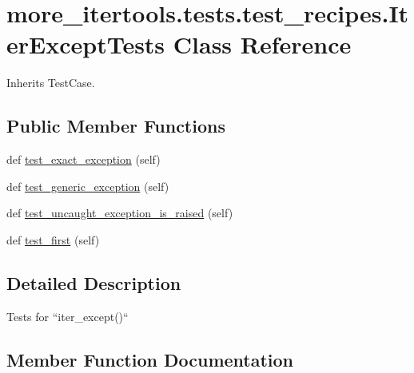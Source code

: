 \hypertarget{classmore__itertools_1_1tests_1_1test__recipes_1_1_iter_except_tests}{}\section{more\+\_\+itertools.\+tests.\+test\+\_\+recipes.\+Iter\+Except\+Tests Class Reference}
\label{classmore__itertools_1_1tests_1_1test__recipes_1_1_iter_except_tests}


Inherits Test\+Case.

\subsection*{Public Member Functions}
\begin{DoxyCompactItemize}
\item 
def \hyperlink{classmore__itertools_1_1tests_1_1test__recipes_1_1_iter_except_tests_a9fdd0549d842e44fb27e8eb0ee215c4c}{test\+\_\+exact\+\_\+exception} (self)
\item 
def \hyperlink{classmore__itertools_1_1tests_1_1test__recipes_1_1_iter_except_tests_a9814b5dc3823464c6ad5ba00b3cfc005}{test\+\_\+generic\+\_\+exception} (self)
\item 
def \hyperlink{classmore__itertools_1_1tests_1_1test__recipes_1_1_iter_except_tests_acbcd3f1ffb21efa2d005fa34e1d79dc3}{test\+\_\+uncaught\+\_\+exception\+\_\+is\+\_\+raised} (self)
\item 
def \hyperlink{classmore__itertools_1_1tests_1_1test__recipes_1_1_iter_except_tests_aa59a3ce8f592965765bbc3b821c923dd}{test\+\_\+first} (self)
\end{DoxyCompactItemize}


\subsection{Detailed Description}
\begin{DoxyVerb}Tests for ``iter_except()``\end{DoxyVerb}
 

\subsection{Member Function Documentation}
\mbox{\label{classmore__itertools_1_1tests_1_1test__recipes_1_1_iter_except_tests_a9fdd0549d842e44fb27e8eb0ee215c4c}} 
